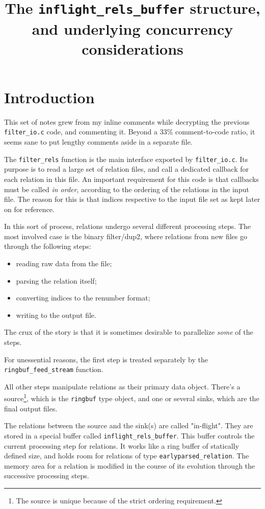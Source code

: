 \documentclass[10pt]{article}
\def\code#1{\texttt{#1}}
\begin{document}
\title{The \code{inflight\_rels\_buffer} structure, and underlying
concurrency considerations}

\section{Introduction}

This set of notes grew from my inline comments while decrypting the
previous \code{filter\_io.c} code, and commenting it. Beyond a 33\%
comment-to-code ratio, it seems sane to put lengthy comments aside in a
separate file.



The \code{filter\_rels} function is the main interface exported by
\code{filter\_io.c}. Its purpose is to read a large set of relation
files, and call a dedicated callback for each relation in this file. An
important requirement for this code is that callbacks must be called
\emph{in order}, according to the ordering of the relations in the input
file. The reason for this is that indices respective to the input file
set as kept later on for reference.

In this sort of process, relations undergo several different processing
steps. The most involved case is the binary filter/dup2, where relations
from new files go through the following steps:

\begin{itemize}
    \item reading raw data from the file;
    \item parsing the relation itself;
    \item converting indices to the renumber format;
    \item writing to the output file.
\end{itemize}

The crux of the story is that it is sometimes desirable to parallelize
\emph{some} of the steps.

For unessential reasons, the first step is treated separately by the
\code{ringbuf\_feed\_stream} function.

All other steps manipulate relations as their primary data object.
There's a source\footnote{The source is unique because of the strict
ordering requirement.}, which is the \code{ringbuf} type object, and one or
several sinks, which are the final output files.

The relations between the source and the sink(s) are called "in-flight".
They are stored in a special buffer called \code{inflight\_rels\_buffer}.
This buffer controls the current processing step for relations. It works
like a ring buffer of statically defined size, and holds room for
relations of type \code{earlyparsed\_relation}. The memory area for a
relation is modified in the course of its evolution through the
successive processing steps.
\end{document}
